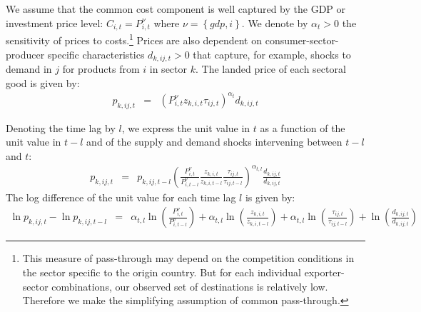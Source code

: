 \documentclass[12pt,twoside,a4paper,notitlepage]{article}
\begin{document}
We assume that the common cost component is well captured by the GDP or investment price level: ${{C}_{i,t}}=P_{i,t}^{\nu}$ where $\nu=\left\{gdp,i\right\}$.
We denote by $\alpha_{t}>0$ the sensitivity of prices to costs.\footnote{This measure of pass-through may depend on the competition conditions in the sector specific to the origin country. But for each individual exporter-sector combinations, our observed set of destinations is relatively low. Therefore we make the simplifying assumption of common pass-through.} 
Prices are also dependent on consumer-sector-producer specific characteristics ${d}_{k,ij,t}>0$ that capture, for example, shocks to demand in $j$ for products from $i$ in sector $k$. 
The landed price of each sectoral good is given by:
\begin{eqnarray}
{p}_{k,ij,t}&=&\left(P_{i,t}^{\nu}{z}_{k,i,t}\tau_{ij,t}\right)^{\alpha_{t}}{d}_{k,ij,t}\nonumber
\end{eqnarray}

Denoting the time lag by $l$, we express the unit value in $t$ as a function of the unit value in $t-l$ and of the supply and demand shocks intervening between $t-l$ and $t$:
\begin{eqnarray}
{p}_{k,ij,t}&=&{p}_{k,ij,t-l}{\left(\frac{P_{i,t}^{\nu}}{P_{i,t-l}^{\nu}}\frac{{z}_{k,i,t}}{{z}_{k,i,t-l}}\frac{{{\tau}_{ij,t}}}{{{\tau}_{ij,t-l}}} \right)^{\alpha_{t,l}}}\frac{{d}_{k,ij,t}}{{d}_{k,ij,t}}\label{eqn:uv}
\end{eqnarray}
The log difference of the unit value for each time lag $l$ is given by:
\begin{eqnarray}
\ln{p}_{k,ij,t}-\ln{p}_{k,ij,t-l}&=&\alpha_{t,l}\ln\left(\frac{P_{i,t}^{\nu}}{P_{i,t-l}^{\nu}}\right)+\alpha_{t,l}\ln\left(\frac{{z}_{k,i,t}}{{z}_{k,i,t-l}} \right)+\alpha_{t,l}\ln\left(\frac{{\tau}_{ij,t}}{{\tau}_{ij,t-l}}\right)+\ln\left(\frac{{d}_{k,ij,t}}{{d}_{k,ij,t}} \right) \label{eqn:lnuv}
\end{eqnarray}
\end{document}
